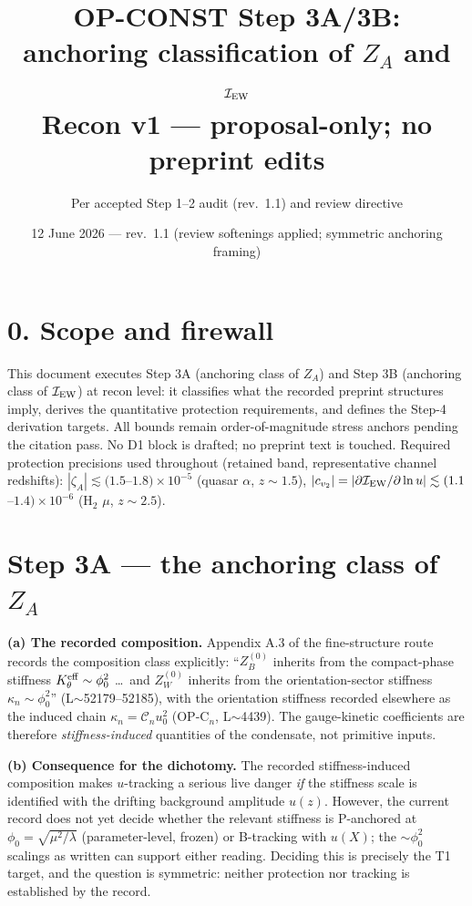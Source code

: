 \documentclass[11pt,a4paper]{article}
\title{\textbf{OP-CONST Step 3A/3B: anchoring classification of $Z_A$ and
$\mathcal I_{\rm EW}$}\\\large Recon v1 --- proposal-only; no preprint edits}
\author{Per accepted Step 1--2 audit (rev.~1.1) and review directive}
\date{12 June 2026 --- rev.~1.1 (review softenings applied; symmetric anchoring framing)}
\begin{document}
\maketitle

\section*{0. Scope and firewall}
This document executes Step 3A (anchoring class of $Z_A$) and Step 3B (anchoring
class of $\mathcal I_{\rm EW}$) at recon level: it classifies what the recorded
preprint structures imply, derives the quantitative protection requirements, and
defines the Step-4 derivation targets. All bounds remain order-of-magnitude stress
anchors pending the citation pass. No D1 block is drafted; no preprint text is
touched. Required protection precisions used throughout (retained band,
representative channel redshifts): $|\zeta_A|\lesssim(1.5$--$1.8)\times10^{-5}$
(quasar $\alpha$, $z\sim1.5$), $|c_{v_2}|=|\partial\mathcal I_{\rm EW}/\partial\ln
u|\lesssim(1.1$--$1.4)\times10^{-6}$ (H$_2$ $\mu$, $z\sim2.5$).

\section{Step 3A --- the anchoring class of $Z_A$}
\textbf{(a) The recorded composition.} Appendix A.3 of the fine-structure route
records the composition class explicitly: ``$Z_B^{(0)}$ inherits from the
compact-phase stiffness $K_\theta^{\rm eff}\sim\phi_0^2$ \dots\ and $Z_W^{(0)}$
inherits from the orientation-sector stiffness $\kappa_n\sim\phi_0^2$''
(L$\sim$52179--52185), with the orientation stiffness recorded elsewhere as the
induced chain $\kappa_n=\mathcal C_n u_0^2$ (OP-C$_n$, L$\sim$4439). The
gauge-kinetic coefficients are therefore \emph{stiffness-induced} quantities of the
condensate, not primitive inputs.

\textbf{(b) Consequence for the dichotomy.} The recorded stiffness-induced
composition makes $u$-tracking a serious live danger \emph{if} the stiffness scale
is identified with the drifting background amplitude $u(z)$. However, the current
record does not yet decide whether the relevant stiffness is P-anchored at
$\phi_0=\sqrt{\mu^2/\lambda}$ (parameter-level, frozen) or B-tracking with $u(X)$;
the $\sim\phi_0^2$ scalings as written can support either reading. Deciding this is
precisely the T1 target, and the question is symmetric: neither protection nor
tracking is established by the record.
\end{document}
